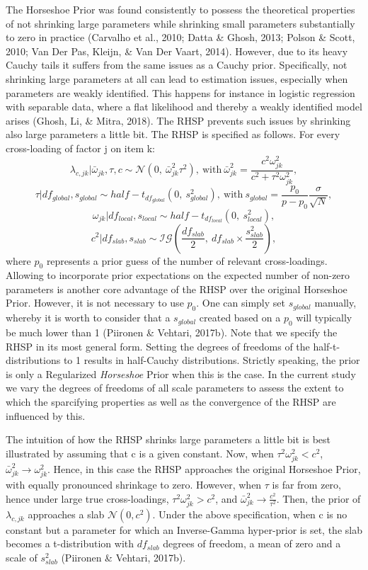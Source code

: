 \documentclass[
  man, donotrepeattitle,floatsintext]{apa6}
\begin{document}
The Horseshoe Prior was found consistently to possess the theoretical properties of not shrinking large parameters while shrinking small parameters substantially to zero in practice (Carvalho et al., 2010; Datta \& Ghosh, 2013; Polson \& Scott, 2010; Van Der Pas, Kleijn, \& Van Der Vaart, 2014). However, due to its heavy Cauchy tails it suffers from the same issues as a Cauchy prior. Specifically, not shrinking large parameters at all can lead to estimation issues, especially when parameters are weakly identified. This happens for instance in logistic regression with separable data, where a flat likelihood and thereby a weakly identified model arises (Ghosh, Li, \& Mitra, 2018). The RHSP prevents such issues by shrinking also large parameters a little bit. The RHSP is specified as follows. For every cross-loading of factor j on item k:
\[\lambda_{c,jk} | \bar{\omega}_{jk}, \tau, c\sim \mathcal{N}(0, \ \bar{\omega}^2_{jk} \tau^2), \ \text{with} \ \bar{\omega}^2_{jk} = \frac{c^2\omega_{jk}^2}{c^2 + \tau^2 \omega_{jk}^2},\]
\[\tau | df_{global}, s_{global} \sim half-t_{df_{global}}(0,\  s_{global}^2), \ \text{with} \  s_{global} = \frac{p_0}{p-p_0}\frac{\sigma}{\sqrt{N}},\]
\[\omega_{jk}| df_{local}, s_{local} \sim half-t_{df_{local}}(0, \ s_{local}^2),\]
\[c^2 | df_{slab}, s_{slab} \sim \mathcal{IG}(\frac{df_{slab}}{2}, \  df_{slab} \times \frac{s_{slab}^2}{2}),\]
where \(p_0\) represents a prior guess of the number of relevant cross-loadings. Allowing to incorporate prior expectations on the expected number of non-zero parameters is another core advantage of the RHSP over the original Horseshoe Prior. However, it is not necessary to use \(p_0\). One can simply set \(s_{global}\) manually, whereby it is worth to consider that a \(s_{global}\) created based on a \(p_0\) will typically be much lower than 1 (Piironen \& Vehtari, 2017b). Note that we specify the RHSP in its most general form. Setting the degrees of freedoms of the half-t-distributions to 1 results in half-Cauchy distributions. Strictly speaking, the prior is only a Regularized \emph{Horseshoe} Prior when this is the case. In the current study we vary the degrees of freedoms of all scale parameters to assess the extent to which the sparcifying properties as well as the convergence of the RHSP are influenced by this.

The intuition of how the RHSP shrinks large parameters a little bit is best illustrated by assuming that c is a given constant. Now, when \(\tau^2 \omega^2_{jk} < c^2\), \(\bar{\omega}^2_{jk} \to \omega^2_{jk}\). Hence, in this case the RHSP approaches the original Horseshoe Prior, with equally pronounced shrinkage to zero. However, when \(\tau\) is far from zero, hence under large true cross-loadings, \(\tau^2 \omega^2_{jk} > c^2\), and \(\bar{\omega}^2_{jk} \to \frac{c^2}{\tau^2}\). Then, the prior of \(\lambda_{c,jk}\) approaches a slab \(\mathcal{N}(0, c^2)\). Under the above specification, when c is no constant but a parameter for which an Inverse-Gamma hyper-prior is set, the slab becomes a t-distribution with \(df_{slab}\) degrees of freedom, a mean of zero and a scale of \(s_{slab}^2\) (Piironen \& Vehtari, 2017b).
\end{document}

